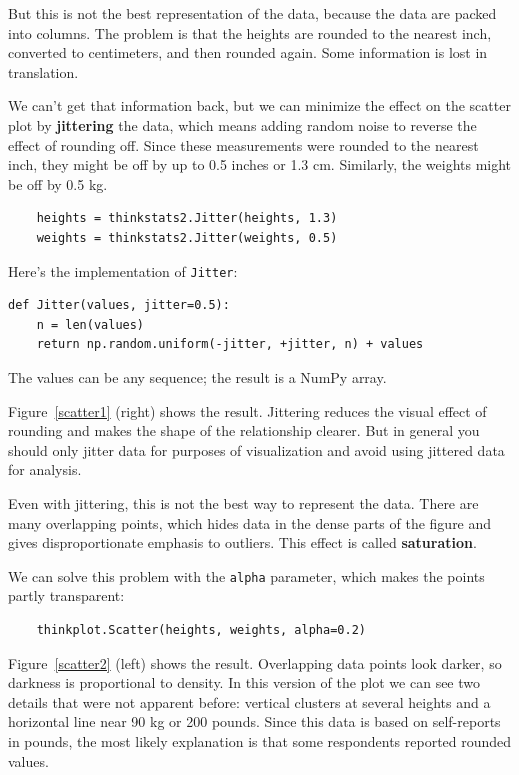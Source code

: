 \documentclass[12pt]{book}
\begin{document}
But this is not the best representation of
the data, because the data are packed into columns.  The problem is
that the heights are rounded to the nearest inch, converted to
centimeters, and then rounded again.  Some information is lost in
translation.    

We can't get that information back, but we can minimize the effect on
the scatter plot by {\bf jittering} the data, which means adding random
noise to reverse the effect of rounding off.  Since these measurements
were rounded to the nearest inch, they might be off by up to 0.5 inches or
1.3 cm.  Similarly, the weights might be off by 0.5 kg.
%
\begin{verbatim}
    heights = thinkstats2.Jitter(heights, 1.3)
    weights = thinkstats2.Jitter(weights, 0.5)
\end{verbatim}

Here's the implementation of {\tt Jitter}:

\begin{verbatim}
def Jitter(values, jitter=0.5):
    n = len(values)
    return np.random.uniform(-jitter, +jitter, n) + values
\end{verbatim}

The values can be any sequence; the result is a NumPy array.

Figure~\ref{scatter1} (right) shows the result.  Jittering reduces the
visual effect of rounding and makes the shape of the relationship
clearer.  But in general you should only jitter data for purposes of
visualization and avoid using jittered data for analysis.

Even with jittering, this is not the best way to represent the data.
There are many overlapping points, which hides data
in the dense parts of the figure and gives disproportionate emphasis
to outliers.  This effect is called {\bf saturation}.

We can solve this problem with the {\tt alpha} parameter, which makes
the points partly transparent:
%
\begin{verbatim}
    thinkplot.Scatter(heights, weights, alpha=0.2)
\end{verbatim}
%
Figure~\ref{scatter2} (left) shows the result.  Overlapping data
points look darker, so darkness is proportional to density.  In this
version of the plot we can see two details that were not apparent before:
vertical clusters at several heights and a horizontal line near 90 kg
or 200 pounds.  Since this data is based on self-reports in pounds,
the most likely explanation is that some respondents reported
rounded values.
\end{document}

